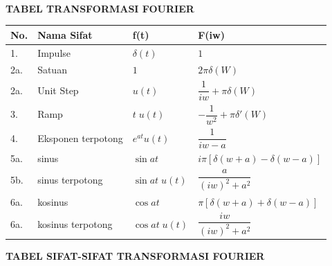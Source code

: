 \documentclass{article}
\begin{document}
\leavevmode\\



\newpage
\begin{center}
    \textbf{TABEL TRANSFORMASI FOURIER}
\end{center}

\begin{table}[H]
    \renewcommand{\arraystretch}{2}
    \begin{center}
        \begin{tabular}{|l|l|l|l|}
            \hline
            \textbf{No.} & \textbf{Nama Sifat} & \textbf{f(t)}     & \textbf{F(iw)}                        \\ \hline
            1.           & Impulse             & $\delta(t)$       & $1$                                   \\ \hline
            2a.          & Satuan              & $1$               & $2\pi \delta (W)$                     \\ \hline
            2a.          & Unit Step           & $u(t)$            & $\dfrac{1}{iw}+\pi\delta (W)$         \\ \hline
            3.           & Ramp                & $t\;u(t)$         & $-\dfrac{1}{w^2}+\pi\delta' (W)$      \\ \hline
            4.           & Eksponen terpotong  & $e^{at} u(t)$     & $\dfrac{1}{iw - a}$                   \\ \hline
            5a.          & sinus               & $\sin at$         & $i\pi[\delta(w + a) - \delta(w - a)]$ \\ \hline
            5b.          & sinus terpotong     & $\sin at \; u(t)$ & $\dfrac{a}{(iw)^2 + a^2}$             \\ \hline
            6a.          & kosinus             & $\cos at$         & $\pi[\delta(w + a) + \delta(w - a)]$  \\ \hline
            6a.          & kosinus terpotong   & $\cos at \; u(t)$ & $\dfrac{iw}{(iw)^2 + a^2}$            \\ \hline
        \end{tabular}
    \end{center}
\end{table}

\begin{center}
    \textbf{TABEL SIFAT-SIFAT TRANSFORMASI FOURIER}
\end{center}
\end{document}

